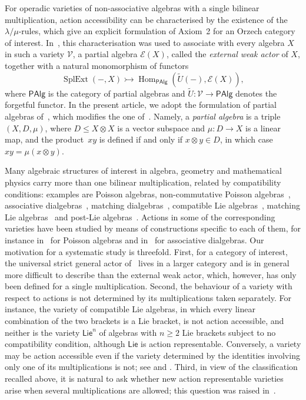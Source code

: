 \documentclass[reqno,a4paper]{amsart}
\theoremstyle{plain}
\theoremstyle{definition}
\theoremstyle{remark}
\numberwithin{equation}{section}
\newcommand{\E}{\mathcal{E}}
\newcommand{\V}{\mathcal{V}}
\DeclareMathOperator{\Hom}{Hom}
\DeclareMathOperator{\SplExt}{SplExt}
\newcommand{\Lie}{\ensuremath{\mathsf{Lie}}}
\newcommand{\PAlg}{\ensuremath{\mathsf{PAlg}}}
\begin{document}
For operadic varieties of non-associative algebras with a single bilinear multiplication, action accessibility can be characterised by the existence of the $\lambda/\mu$-rules, which give an explicit formulation of Axiom~2 for an Orzech category of interest. In~\cite{WRAAlg}, this characterisation was used to associate with every algebra $X$ in such a variety $\V$, a partial algebra $\E(X)$, called the \emph{external weak actor} of $X$, together with a natural monomorphism of functors
\[
\SplExt(-,X)\rightarrowtail\Hom_{\PAlg}(\widetilde U(-),\E(X)),
\]
where $\PAlg$ is the category of partial algebras and $\widetilde U \colon \V \to \PAlg$ denotes the forgetful functor. In the present article, we adopt the formulation of partial algebras of~\cite{SurveyActions}, which modifies the one of~\cite{WRAAlg}. Namely, a \emph{partial algebra} is a triple $(X,D,\mu)$, where $D\leq X\otimes X$ is a vector subspace and $\mu\colon D\to X$ is a linear map, and the product~$xy$ is defined if and only if $x\otimes y\in D$, in which case $xy=\mu(x\otimes y)$.

Many algebraic structures of interest in algebra, geometry and mathematical physics carry more than one bilinear multiplication, related by compatibility conditions: examples are Poisson algebras, non-commutative Poisson algebras~\cite{CasasDatuashviliNLP,CasasDatuashviliLadraNPLR}, associative dialgebras~\cite{LodayDialgebras}, matching dialgebras~\cite{ZhangBaiGuo}, compatible Lie algebras~\cite{Strohmayer}, matching Lie algebras~\cite{GaoGuoZhang} and post-Lie algebras~\cite{VallettePostLie}. Actions in some of the corresponding varieties have been studied by means of constructions specific to each of them, for instance in~\cite{CigoliManciniMetere} for Poisson algebras and in~\cite{CasasEtAlTetra} for associative dialgebras. Our motivation for a systematic study is threefold. First, for a category of interest, the universal strict general actor of~\cite{Casas} lives in a larger category and is in general more difficult to describe than the external weak actor, which, however, has only been defined for a single multiplication. Second, the behaviour of a variety with respect to actions is not determined by its multiplications taken separately. For instance, the variety of compatible Lie algebras, in which every linear combination of the two brackets is a Lie bracket, is not action accessible, and neither is the variety $\Lie^n$ of algebras with $n\geq2$ Lie brackets subject to no compatibility condition, although $\Lie$ is action representable. Conversely, a variety may be action accessible even if the variety determined by the identities involving only one of its multiplications is not; see  and . Third, in view of the classification recalled above, it is natural to ask whether new action representable varieties arise when several multiplications are allowed; this question was raised in~\cite[Section~6.6]{Tim}.
\end{document}
